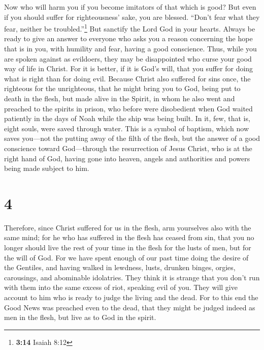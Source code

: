  Now who will harm you if you become imitators of that
which is good?  But even if you should suffer for
righteousness' sake, you are blessed. ``Don't fear what they fear,
neither be troubled.''\footnote{\textbf{3:14} Isaiah 8:12}
 But sanctify the Lord God in your hearts. Always be
ready to give an answer to everyone who asks you a reason concerning the
hope that is in you, with humility and fear,  having a
good conscience. Thus, while you are spoken against as evildoers, they
may be disappointed who curse your good way of life in Christ.
 For it is better, if it is God's will, that you suffer
for doing what is right than for doing evil.  Because
Christ also suffered for sins once, the righteous for the unrighteous,
that he might bring you to God, being put to death in the flesh, but
made alive in the Spirit,  in whom he also went and
preached to the spirits in prison,  who before were
disobedient when God waited patiently in the days of Noah while the ship
was being built. In it, few, that is, eight souls, were saved through
water.  This is a symbol of baptism, which now saves
you---not the putting away of the filth of the flesh, but the answer of
a good conscience toward God---through the resurrection of Jesus Christ,
 who is at the right hand of God, having gone into
heaven, angels and authorities and powers being made subject to him.

\hypertarget{section-3}{%
\section{4}\label{section-3}}

 Therefore, since Christ suffered for us in the flesh, arm
yourselves also with the same mind; for he who has suffered in the flesh
has ceased from sin,  that you no longer should live the
rest of your time in the flesh for the lusts of men, but for the will of
God.  For we have spent enough of our past time doing the
desire of the Gentiles, and having walked in lewdness, lusts, drunken
binges, orgies, carousings, and abominable idolatries. 
They think it is strange that you don't run with them into the same
excess of riot, speaking evil of you.  They will give
account to him who is ready to judge the living and the dead.
 For to this end the Good News was preached even to the
dead, that they might be judged indeed as men in the flesh, but live as
to God in the spirit.

